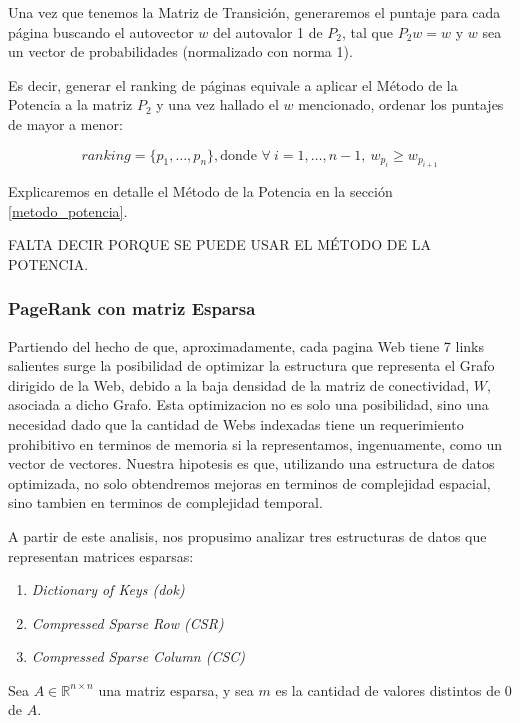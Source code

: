 Una vez que tenemos la Matriz de Transición, generaremos el puntaje para cada página
 buscando el autovector $w$ del autovalor 1 de $P_{2}$, tal que $P_{2}w = w$ y
$w$ sea un vector de probabilidades (normalizado con norma 1).

Es decir, generar el ranking de páginas equivale a aplicar el Método de la Potencia
a la matriz $P_{2}$ y una vez hallado el $w$ mencionado, ordenar los puntajes de
mayor a menor:

\begin{equation} \label{eq:ranking_page_rank}
    ranking = \{ p_1, \dots, p_n \}, \text{donde } \forall\ i=1,\dots,n-1,\ w_{p_{i}} \geq w_{p_{i+1}}
\end{equation}

Explicaremos en detalle el Método de la Potencia en la sección \ref{metodo_potencia}.

FALTA DECIR PORQUE SE PUEDE USAR EL MÉTODO DE LA POTENCIA.

\subsubsection{PageRank con matriz Esparsa}

Partiendo del hecho de que, aproximadamente, cada pagina Web tiene 7 links salientes\cite{Kamvar2003} surge la posibilidad de optimizar la estructura que representa el Grafo dirigido de la Web, debido a la baja densidad de la matriz de conectividad, $W$, asociada a dicho Grafo.
Esta optimizacion no es solo una posibilidad, sino una necesidad dado que la cantidad de Webs indexadas tiene un requerimiento prohibitivo en terminos de memoria si la representamos, ingenuamente, como un vector de vectores.
Nuestra hipotesis es que, utilizando una estructura de datos optimizada, no solo obtendremos mejoras en terminos de complejidad espacial, sino tambien en terminos de complejidad temporal.

A partir de este analisis, nos propusimo analizar tres estructuras de datos que representan matrices esparsas:
\begin{enumerate}
  \item \textit{Dictionary of Keys (dok)}
  \item \textit{Compressed Sparse Row (CSR)}
  \item \textit{Compressed Sparse Column (CSC)}
\end{enumerate}

Sea $A \in \mathbb{R}^{n \times n}$ una matriz esparsa, y sea $m$ es la cantidad de valores distintos de 0 de $A$.

